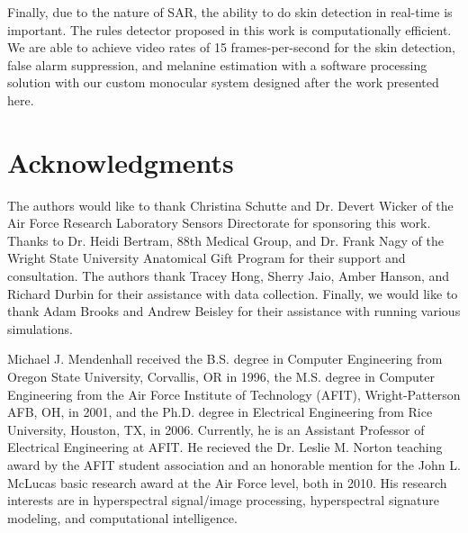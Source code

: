 \documentclass[10pt,journal,cspaper,compsoc]{IEEEtran}
\begin{document}
Finally, due to the nature of SAR, the ability to do skin detection in real-time is important.  The rules detector proposed 
in this work is computationally efficient.  We are able to achieve video rates of 15 frames-per-second for the skin detection, 
false alarm suppression, and melanine estimation with a software processing solution with our custom monocular system designed 
after the work presented here.



\section*{Acknowledgments}
The authors would like to thank Christina Schutte and Dr. Devert Wicker of the Air Force Research Laboratory 
Sensors Directorate for sponsoring this work. Thanks to Dr. Heidi Bertram, 88th Medical Group, and 
Dr. Frank Nagy of the Wright State University Anatomical Gift Program for their support and consultation. The authors thank 
Tracey Hong, Sherry Jaio, Amber Hanson, and Richard Durbin for their assistance with data collection.  Finally, we would like
to thank Adam Brooks and Andrew Beisley for their assistance with running various simulations.

\begin{IEEEbiography}{Michael J. Mendenhall} %
received the B.S. degree in Computer Engineering from Oregon State University, Corvallis, OR in 1996, the M.S. degree in Computer Engineering 
from the Air Force Institute of Technology (AFIT), Wright-Patterson AFB, OH, in 2001, and the Ph.D. degree in Electrical Engineering from Rice 
University, Houston, TX, in 2006. Currently, he is an Assistant Professor of Electrical Engineering at AFIT. He recieved the Dr. Leslie M. Norton 
teaching award by the AFIT student association and an honorable mention for the John L. McLucas basic research award at the Air Force level, 
both in 2010.  His research interests are in hyperspectral signal/image processing, hyperspectral signature modeling, and computational intelligence.  
\end{IEEEbiography}
\end{document}
